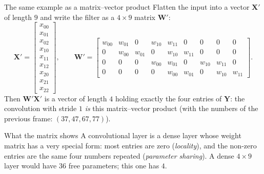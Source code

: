 \documentclass[10pt,aspectratio=169]{beamer}
\begin{document}
\begin{frame}{The same example as a matrix--vector product}
\small
Flatten the input into a vector $\bm{X}'$ of length $9$ and write the
filter as a $4\times9$ matrix $\bm{W}'$:
\[
  \bm{X}'=\begin{bmatrix}x_{00}\\x_{01}\\x_{02}\\x_{10}\\x_{11}\\x_{12}\\x_{20}\\x_{21}\\x_{22}\end{bmatrix},
  \qquad
  \bm{W}'=\begin{bmatrix}
  w_{00}&w_{01}&0&w_{10}&w_{11}&0&0&0&0\\
  0&w_{00}&w_{01}&0&w_{10}&w_{11}&0&0&0\\
  0&0&0&w_{00}&w_{01}&0&w_{10}&w_{11}&0\\
  0&0&0&0&w_{00}&w_{01}&0&w_{10}&w_{11}
  \end{bmatrix}.
\]
Then $\bm{W}'\bm{X}'$ is a vector of length $4$ holding exactly the four
entries of $\bm{Y}$: the convolution with stride $1$ \emph{is} this
matrix--vector product (with the numbers of the previous frame:
$(37,47,67,77)$).
\begin{block}{What the matrix shows}
A convolutional layer is a dense layer whose weight matrix has a very
special form: most entries are zero (\emph{locality}), and the non-zero
entries are the same four numbers repeated (\emph{parameter sharing}).
A dense $4\times9$ layer would have $36$ free parameters; this one has $4$.
\end{block}
\end{frame}
\end{document}
